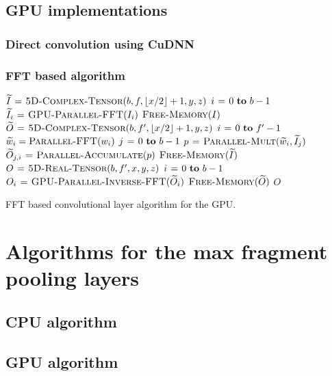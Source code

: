 \documentclass[conference]{IEEEtran}
\DeclarePairedDelimiter{\floor}{\lfloor}{\rfloor}
\begin{document}
\subsection{GPU implementations}

\subsubsection{Direct convolution using CuDNN}

\subsubsection{FFT based algorithm}


\begin{algorithm}
  {\small
  \begin{codebox}
    \li $\widetilde{I} \gets \proc{5D-Complex-Tensor}(b,f,\floor{x/2}+1,y,z)$
    \li \For $i \gets 0 \To b-1$
    \li   \Do $\widetilde{I}_{i} \mathrel{\hspace{1pt}=\hspace{1pt}} \textnormal{\scshape GPU-Parallel-FFT}(I_{i})$
    \End
    \li $\textnormal{\scshape Free-Memory}(I)$
    \li $\widetilde{O} \gets \proc{5D-Complex-Tensor}(b,f',\floor{x/2}+1,y,z)$
    \li \For $i \gets 0 \To f'-1$
    \li    \Do $\widetilde{w}_{i} = \textnormal{\scshape Parallel-FFT}(w_{i})$
    \li        \For $j \gets 0 \To b-1$
    \li           \Do $p \mathrel{\hspace{1pt}=\hspace{1pt}} \textnormal{\scshape Parallel-Mult}(\widetilde{w}_{i}, \widetilde{I}_{j})$
    \li               $\widetilde{O}_{j,i} \mathrel{\hspace{1pt}=\hspace{1pt}} \textnormal{\scshape Parallel-Accumulate}(p)$
    \End \End
    \li $\textnormal{\scshape Free-Memory}(\widetilde{I})$
    \li $O \mathrel{\hspace{1pt}=\hspace{1pt}} \textnormal{\scshape5D-Real-Tensor}(b,f',x,y,z)$
    \li \For $i \gets 0 \To b-1$
    \li   \Do $O_{i} \mathrel{\hspace{1pt}=\hspace{1pt}} \textnormal{\scshape GPU-Parallel-Inverse-FFT}(\widetilde{O}_{i})$
    \End
    \li $\textnormal{\scshape Free-Memory}(\widetilde{O})$
    \li \Return $O$
  \end{codebox}
  }

  \caption{FFT based convolutional layer algorithm for the GPU.}
  \label{alg:gpu_alg}
\end{algorithm}

\section{Algorithms for the max fragment pooling layers}



\subsection{CPU algorithm}
\subsection{GPU algorithm}
\end{document}
